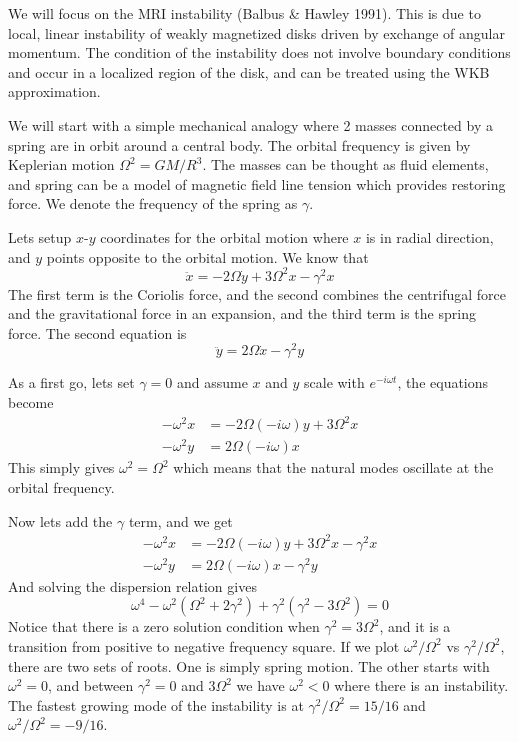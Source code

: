 \documentclass[letterpaper, 11pt]{article}
\numberwithin{equation}{section}
\numberwithin{figure}{section}
\begin{document}
We will focus on the MRI instability (Balbus \& Hawley 1991). This is due to
local, linear instability of weakly magnetized disks driven by exchange of
angular momentum. The condition of the instability does not involve boundary
conditions and occur in a localized region of the disk, and can be treated using
the WKB approximation.

We will start with a simple mechanical analogy where 2 masses connected by a
spring are in orbit around a central body. The orbital frequency is given by
Keplerian motion $\Omega^2 = GM/R^{3}$. The masses can be thought as fluid
elements, and spring can be a model of magnetic field line tension which
provides restoring force. We denote the frequency of the spring as $\gamma$.

Lets setup $x$-$y$ coordinates for the orbital motion where $x$ is in radial
direction, and $y$ points opposite to the orbital motion. We know that
\begin{equation}
  \label{eq:11}
  \ddot{x} = -2\Omega \dot{y} + 3\Omega^{2}x - \gamma^2x
\end{equation}
The first term is the Coriolis force, and the second combines the centrifugal
force and the gravitational force in an expansion, and the third term is the
spring force. The second equation is
\begin{equation}
  \label{eq:12}
  \ddot{y} = 2\Omega \dot{x} - \gamma^{2}y
\end{equation}

As a first go, lets set $\gamma = 0$ and assume $x$ and $y$ scale with
$e^{-i\omega t}$, the equations become
\begin{align}
  \label{eq:13}
  -\omega^2x &= -2\Omega(-i\omega) y + 3\Omega^2 x \\
  -\omega^2y &= 2\Omega(-i\omega)x
\end{align}
This simply gives $\omega^2 = \Omega^2$ which means that the natural modes
oscillate at the orbital frequency.

Now lets add the $\gamma$ term, and we get
\begin{align}
  \label{eq:14}
  -\omega^2x &= -2\Omega(-i\omega) y + 3\Omega^2 x - \gamma^2x \\
  -\omega^2y &= 2\Omega(-i\omega)x - \gamma^2y
\end{align}
And solving the dispersion relation gives
\begin{equation}
  \label{eq:14}
  \omega^4 - \omega^2(\Omega^2 + 2\gamma^2) + \gamma^2(\gamma^2 - 3\Omega^2) = 0
\end{equation}
Notice that there is a zero solution condition when $\gamma^2 = 3\Omega^2$, and
it is a transition from positive to negative frequency square. If we plot
$\omega^2/\Omega^2$ vs $\gamma^2/\Omega^2$, there are two sets of roots. One is
simply spring motion. The other starts with $\omega^{2} = 0$, and between
$\gamma^2 = 0$ and $3\Omega^2$ we have $\omega^2 < 0$ where there is an
instability. The fastest growing mode of the instability is at
$\gamma^2/\Omega^2 = 15/16$ and $\omega^2/\Omega^2 = -9/16$.
\end{document}
